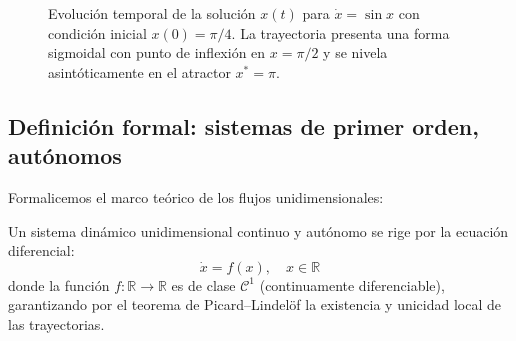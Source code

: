 \begin{figure}[htbp]
\centering
{}
\caption{Evolución temporal de la solución $x(t)$ para $\dot{x} = \sin x$ con condición inicial $x(0) = \pi/4$. La trayectoria presenta una forma sigmoidal con punto de inflexión en $x = \pi/2$ y se nivela asintóticamente en el atractor $x^* = \pi$.}
\label{fig:trayectoria_sin_x}
\end{figure}

\subsection{Definición formal: sistemas de primer orden, autónomos}

Formalicemos el marco teórico de los flujos unidimensionales:

\begin{definition}
    Un sistema dinámico unidimensional continuo y autónomo se rige por la ecuación diferencial:
    \begin{equation}
        \dot{x} = f(x), \quad x \in \mathbb{R}
        \label{eq:flujo_1d_def}
    \end{equation}
    donde la función $f: \mathbb{R} \to \mathbb{R}$ es de clase $\mathcal{C}^1$ (continuamente diferenciable), garantizando por el teorema de Picard--Lindelöf la existencia y unicidad local de las trayectorias.
\end{definition}

